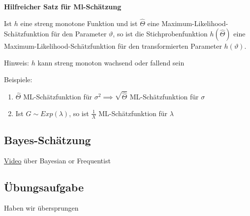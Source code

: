 \documentclass[a4paper]{article}
\begin{document}

\textbf{Hilfreicher Satz für Ml-Schätzung}

Ist $h$ eine streng monotone Funktion und ist $\hat{\Theta}$ eine Maximum-Likelihood-Schätzfunktion für den Parameter $\vartheta$, so ist die Stichprobenfunktion $h(\hat{\Theta})$ eine Maximum-Likelihood-Schätzfunktion für den transformierten Parameter $h(\vartheta)$.

Hinweis: $h$ kann streng monoton wachsend oder fallend sein

Beispiele:

\begin{enumerate}
    \item $\hat{\Theta}$ ML-Schätzfunktion für $\sigma^2 \implies \sqrt{\hat{\Theta}}$ ML-Schätzfunktion für $\sigma$
    \item Ist $G \sim Exp(\lambda)$, so ist $\frac{1}{X}$ ML-Schätzfunktion für $\lambda$
\end{enumerate}

\subsection{Bayes-Schätzung}



\href{https://www.youtube.com/watch?v=GEFxFVESQXc}{Video} über Bayesian or Frequentist

\subsection{Übungsaufgabe}

Haben wir übersprungen
\end{document}
